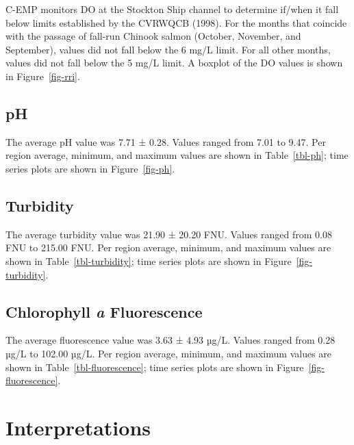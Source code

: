 \documentclass[
  letterpaper,
]{article}
\begin{document}
C-EMP monitors DO at the Stockton Ship channel to determine if/when it
fall below limits established by the CVRWQCB (1998). For the months that
coincide with the passage of fall-run Chinook salmon (October, November,
and September), values did not fall below the 6 mg/L limit. For all
other months, values did not fall below the 5 mg/L limit. A boxplot of
the DO values is shown in Figure~\ref{fig-rri}.

\subsection{pH}\label{ph}

The average pH value was 7.71 ± 0.28. Values ranged from 7.01 to 9.47.
Per region average, minimum, and maximum values are shown in
Table~\ref{tbl-ph}; time series plots are shown in Figure~\ref{fig-ph}.

\subsection{Turbidity}\label{turbidity}

The average turbidity value was 21.90 ± 20.20 FNU. Values ranged from
0.08 FNU to 215.00 FNU. Per region average, minimum, and maximum values
are shown in Table~\ref{tbl-turbidity}; time series plots are shown in
Figure~\ref{fig-turbidity}.

\subsection{\texorpdfstring{Chlorophyll \emph{a}
Fluorescence}{Chlorophyll a Fluorescence}}\label{chlorophyll-a-fluorescence}

The average fluorescence value was 3.63 ± 4.93 µg/L. Values ranged from
0.28 µg/L to 102.00 µg/L. Per region average, minimum, and maximum
values are shown in Table~\ref{tbl-fluorescence}; time series plots are
shown in Figure~\ref{fig-fluorescence}.

\section{Interpretations}\label{interpretations}
\end{document}
